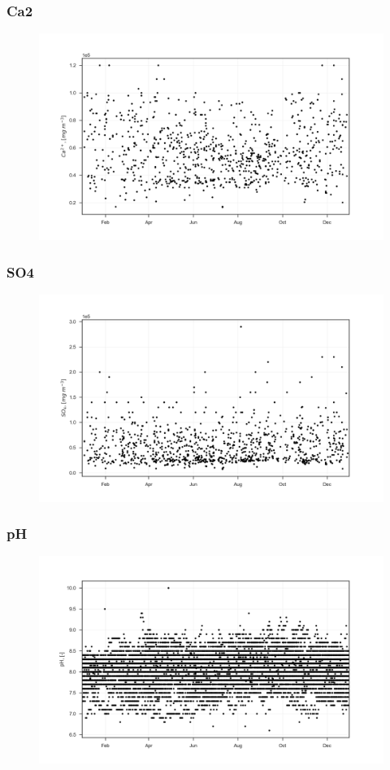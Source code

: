 \documentclass{beamer}
\begin{document}
\begin{frame}
\frametitle{Ca2}
\begin{figure}
\includegraphics[width=\textwidth]{rivers/all/1yr_graph/Ca2.png}
\end{figure}
\end{frame}

\begin{frame}
\frametitle{SO4}
\begin{figure}
\includegraphics[width=\textwidth]{rivers/all/1yr_graph/SO4.png}
\end{figure}
\end{frame}

\begin{frame}
\frametitle{pH}
\begin{figure}
\includegraphics[width=\textwidth]{rivers/all/1yr_graph/pH.png}
\end{figure}
\end{frame}
\end{document}
